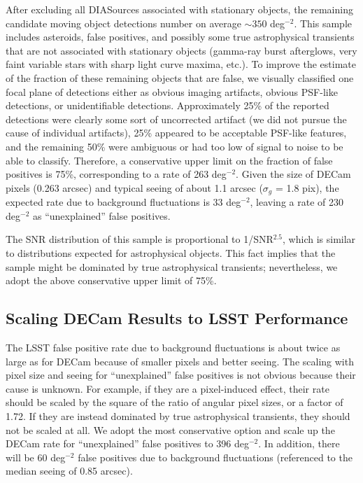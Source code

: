 After excluding all DIASources associated with stationary objects, the
remaining candidate moving object detections number on average $\sim 350$ 
deg$^{-2}$. This sample includes asteroids, false positives, and possibly some
true astrophysical transients that are not associated with stationary objects
(gamma-ray burst afterglows, very faint variable stars with sharp light 
curve maxima, etc.). To improve the estimate of the fraction of these remaining
objects that are false, we visually classified one focal plane of detections either 
as obvious imaging artifacts, obvious PSF-like detections, or unidentifiable
detections. Approximately 25\% of the reported detections were clearly some 
sort of uncorrected artifact (we did not pursue the cause of individual artifacts),
25\% appeared to be acceptable PSF-like features, and the remaining 50\% were
ambiguous or had too low of signal to noise to be able to classify.
Therefore, a conservative upper limit on the fraction of false positives is 75\%,
corresponding to a rate of 263 deg$^{-2}$. Given the size of DECam pixels 
(0.263 arcsec) and typical seeing of about 1.1 arcsec ($\sigma_g$ = 1.8 pix), 
the expected rate due to background fluctuations is 33 deg$^{-2}$, leaving
a rate of 230 deg$^{-2}$ as ``unexplained'' false positives. 

The SNR distribution of this sample is proportional to 1/SNR$^{2.5}$, which
is similar to distributions expected for astrophysical objects. This fact implies
that the sample might be dominated by true astrophysical transients; nevertheless,
we adopt the above conservative upper limit of 75\%.  


\subsection{Scaling DECam Results to LSST Performance} 

The LSST false positive rate due to background fluctuations is about twice
as large as for DECam because of smaller pixels and better seeing. The scaling
with pixel size and seeing for ``unexplained'' false positives is not obvious
because their cause is unknown. For example, if they are a pixel-induced effect, 
their rate should be scaled by the square of the ratio of angular pixel sizes, or
a factor of 1.72. If they are instead dominated by true astrophysical transients,
they should not be scaled at all. We adopt the most conservative option and 
scale up the DECam rate for ``unexplained'' false positives to 396 deg$^{-2}$. 
In addition, there will be 60 deg$^{-2}$ false positives due to background 
fluctuations (referenced to the median seeing of 0.85 arcsec). 

